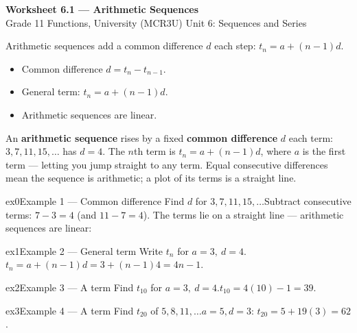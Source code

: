 \documentclass[11pt]{article}
\begin{document}
\begin{center}
{\LARGE\bfseries\color{titleblue}Worksheet 6.1 --- Arithmetic Sequences}\\[2pt]
{\small Grade 11 Functions, University (MCR3U) \textperiodcentered{} Unit 6: Sequences and Series}
\end{center}

\begin{ideabox}
Arithmetic sequences add a common difference $d$ each step: $t_n=a+(n-1)d$.
\begin{itemize}[leftmargin=*,itemsep=2pt]
  \item Common difference $d=t_{n}-t_{n-1}$.
  \item General term: $t_n=a+(n-1)d$.
  \item Arithmetic sequences are linear.
\end{itemize}
\end{ideabox}

\begin{learnbox}
An \textbf{arithmetic sequence} rises by a fixed \textbf{common difference} $d$ each term: $3, 7, 11, 15,\dots$ has $d=4$.
The $n$th term is $t_n=a+(n-1)d$, where $a$ is the first term — letting you jump straight to any term.
Equal consecutive differences mean the sequence is arithmetic; a plot of its terms is a straight line.
\end{learnbox}


\begin{example}{ex0}{Example 1 --- Common difference}
Find $d$ for $3,7,11,15,\dots$\soln Subtract consecutive terms: $7-3=4$ (and $11-7=4$). The terms lie on a straight line — arithmetic sequences are linear:
\end{example}

\begin{example}{ex1}{Example 2 --- General term}
Write $t_n$ for $a=3,\ d=4$.\soln $t_n=a+(n-1)d=3+(n-1)4=4n-1$.
\end{example}

\begin{example}{ex2}{Example 3 --- A term}
Find $t_{10}$ for $a=3,\ d=4$.\soln $t_{10}=4(10)-1=39$.
\end{example}

\begin{example}{ex3}{Example 4 --- A term}
Find $t_{20}$ of $5,8,11,\dots$\soln $a=5,d=3$: $t_{20}=5+19(3)=62$.
\end{example}
\end{document}
